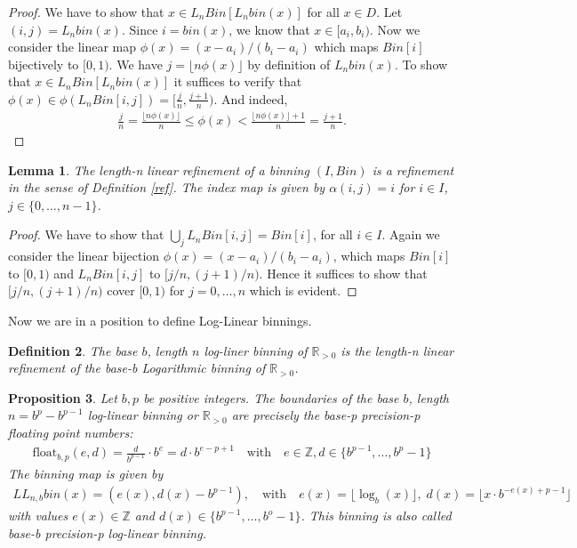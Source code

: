 \documentclass{article}
\theoremstyle{plain}
\newtheorem{definition}{Definition}[section]
\newtheorem{lemma}[definition]{Lemma}
\newtheorem{proposition}[definition]{Proposition}
\theoremstyle{remark}
\newcommand{\IR}{\mathbb{R}}
\newcommand{\IZ}{\mathbb{Z}}
\newcommand{\Union}{\bigcup}
\newcommand{\qtext}[1]{\quad\text{#1}\quad} %
\newcommand{\floor}[1]{\lfloor#1\rfloor}
\newcommand{\float}{\mathrm{float}}
\begin{document}
\begin{proof}
  We have to show that $x \in L_nBin[ L_nbin(x) ]$ for all $x \in D$.
  Let $(i,j) = L_nbin(x)$.
  Since $i = bin(x)$, we know that $x \in [a_i, b_i)$.
  Now we consider the linear map $\phi(x) = (x-a_i)/(b_i-a_i)$ which maps $Bin[i]$ bijectively to $[0,1)$.
  We have $j = \floor{ n \phi(x) }$ by definition of $L_nbin(x)$.
  To show that $x \in L_nBin[ L_nbin(x) ]$ it suffices to verify
  that $\phi(x) \in \phi(L_nBin[i,j]) = [ \frac{j}{n}, \frac{j+1}{n} )$.
  And indeed,
  \begin{align*}
    \frac{j}{n} = \frac{\floor{ n \phi(x) }}{n} \leq \phi(x) <
    \frac{\floor{ n \phi(x) } + 1 }{n} =  \frac{j+1}{n}.
  \end{align*}
\end{proof}

\begin{lemma}
  The length-n linear refinement of a binning $(I, Bin)$ is a refinement in the sense of Definition \ref{ref}.
  The index map is given by $\alpha(i,j) = i$ for $i \in I$, $j \in \{0,\dots,n-1\}$.
\end{lemma}

\begin{proof}
  We have to show that $\Union_{j} L_nBin[i,j] = Bin[i]$, for all $i \in I$.
  Again we consider the linear bijection $\phi(x) = (x-a_i)/(b_i-a_i)$, which maps $Bin[i]$ to $[0,1)$ and $L_nBin[i,j]$ to $[j/n, (j+1)/n)$.
  Hence it suffices to show that $[j/n, (j+1)/n)$ cover $[0,1)$ for $j=0,\dots,n$ which is evident.
\end{proof}

Now we are in a position to define Log-Linear binnings.

\begin{definition}
  The base $b$, length $n$ log-liner binning of $\IR_{>0}$ is the length-n linear refinement of the base-b Logarithmic binning of $\IR_{>0}$.
\end{definition}

\begin{proposition}\label{prop:ll}
  Let $b,p$ be positive integers. The boundaries of the base $b$, length $n = b^p - b^{p-1}$ log-linear
  binning or $\IR_{>0}$ are precisely the base-p precision-p floating point numbers:
  \begin{align*}
    \float_{b,p}(e, d) = \frac{d}{b^{p-1}} \cdot b^e = d \cdot b^{e-p+1} \qtext{with} e \in \IZ, d \in \{ b^{p-1}, \dots, b^p - 1 \}
  \end{align*}
  The binning map is given by
  \begin{align*}
    LL_{n,b}bin(x) = (e(x), d(x) - b^{p-1}), \qtext{with} e(x) = \floor{\log_b(x)},\; d(x) = \floor{x \cdot b^{-e(x) + p - 1}}
  \end{align*}
  with values $e(x) \in \IZ$ and $d(x) \in \{b^{p-1}, \dots, b^{o} - 1\}$.
  This binning is also called base-b precision-p log-linear binning.
\end{proposition}
\end{document}
